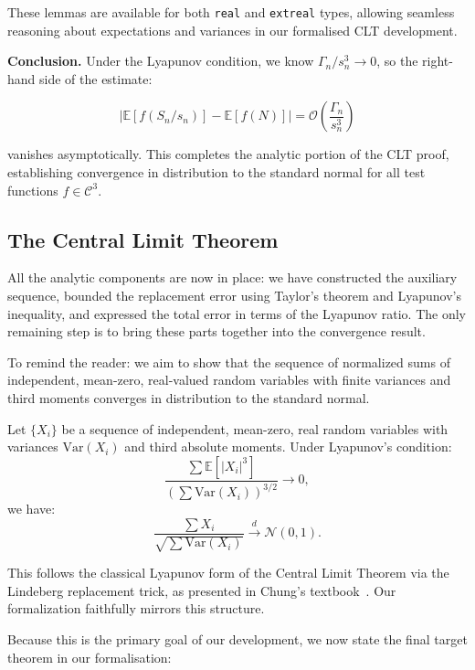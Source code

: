 These lemmas are available for both \texttt{real} and \texttt{extreal} types, allowing seamless reasoning about expectations and variances in our formalised CLT development.


\medskip
\noindent
\textbf{Conclusion.} Under the Lyapunov condition, we know \( \Gamma_n / s_n^3 \to 0 \), so the right-hand side of the estimate:

\[
\left| \mathbb{E}[f(S_n / s_n)] - \mathbb{E}[f(N)] \right| = \mathcal{O}\left( \frac{\Gamma_n}{s_n^3} \right)
\]

vanishes asymptotically. This completes the analytic portion of the CLT proof, establishing convergence in distribution to the standard normal for all test functions \( f \in \mathcal{C}^3 \).

\subsection{The Central Limit Theorem}

All the analytic components are now in place: we have constructed the auxiliary sequence, bounded the replacement error using Taylor's theorem and Lyapunov's inequality, and expressed the total error in terms of the Lyapunov ratio. The only remaining step is to bring these parts together into the convergence result.

To remind the reader: we aim to show that the sequence of normalized sums of independent, mean-zero, real-valued random variables with finite variances and third moments converges in distribution to the standard normal.

\begin{theorem}
  \label{thm:central-limit}
  Let $\{X_i\}$ be a sequence of independent, mean-zero, real random variables with variances $\text{Var}(X_i)$ and third absolute moments. Under Lyapunov's condition:
  \[
  \frac{\sum \mathbb{E}[|X_i|^3]}{\left( \sum \text{Var}(X_i) \right)^{3/2}} \to 0,
  \]
  we have:
  \[
  \frac{\sum X_i}{\sqrt{\sum \text{Var}(X_i)}} \xrightarrow{d} \mathcal{N}(0, 1).
  \]
\end{theorem}


This follows the classical Lyapunov form of the Central Limit Theorem via the Lindeberg replacement trick, as presented in Chung’s textbook~\cite{Chung:2001}. Our formalization faithfully mirrors this structure.

\medskip

Because this is the primary goal of our development, we now state the final target theorem in our formalisation:

